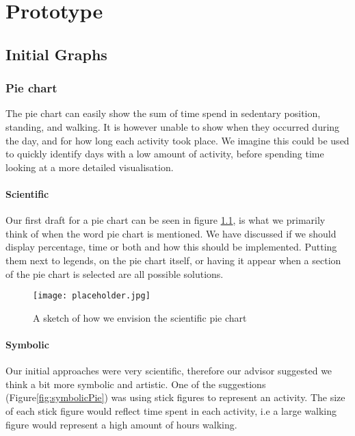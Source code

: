 \chapter{Prototype} %

\label{Chapter5} %


\section{Initial Graphs}

\subsection{Pie chart}
The pie chart can easily show the sum of time spend in sedentary position, standing, and walking. It is however unable to show when they occurred during the day, and for how long each activity took place. We imagine this could be used to quickly identify days with a low amount of activity, before spending time looking at a more detailed visualisation.


\subsubsection{Scientific}
Our first draft for a pie chart can be seen in figure \ref{fig:scientificPie}, is what we primarily think of when the word pie chart is mentioned. We have discussed if we should display percentage, time or both and how this should be implemented. Putting them next to legends, on the pie chart itself, or having it appear when a section of the pie chart is selected are all possible solutions.


\begin{figure}[h!]
	\centering
		\texttt{[image: placeholder.jpg]}
		\caption{\footnotesize A sketch of how we envision the scientific pie chart}
		\label{fig:scientificPie}
\end{figure}

\subsubsection{Symbolic}
Our initial approaches were very scientific, therefore our advisor suggested we think a bit more symbolic and artistic. One of the suggestions (Figure\ref{fig:symbolicPie}) was using stick figures to represent an activity. The size of each stick figure would reflect time spent in each activity, i.e a large walking figure would represent a high amount of hours walking. %

